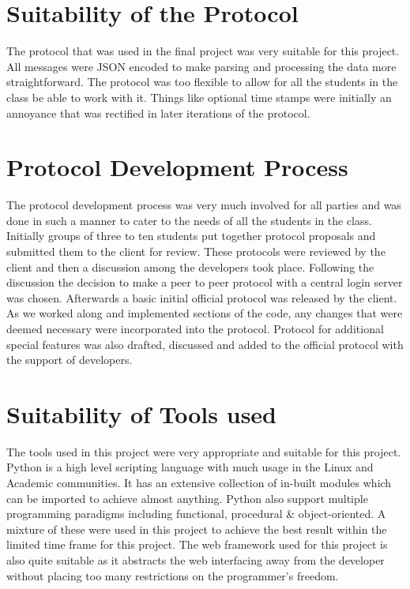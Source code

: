 \documentclass[a4paper,10pt,twoside]{article}
\begin{document}
\section{Suitability of the Protocol}

The protocol that was used in the final project was very suitable for this project. All messages were JSON encoded to make parsing and processing the data more straightforward. The protocol was too flexible to allow for all the students in the class be able to work with it. Things like optional time stamps were initially an annoyance that was rectified in later iterations of the protocol. 

\section{Protocol Development Process}

The protocol development process was very much involved for all parties and was done in such a manner to cater to the needs of all the students in the class. Initially groups of three to ten students put together protocol proposals and submitted them to the client for review. These protocols were reviewed by the client and then a discussion among the developers took place. Following the discussion the decision to make a peer to peer protocol with a central login server was chosen. Afterwards a basic initial official protocol was released by the client. As we worked along and implemented sections of the code, any changes that were deemed necessary were incorporated into the protocol. Protocol for additional special features was also drafted, discussed and added to the official protocol with the support of developers.

\section{Suitability of Tools used}

The tools used in this project were very appropriate and suitable for this project. Python is a high level scripting language with much usage in the Linux and Academic communities. It has an extensive collection of in-built modules which can be imported to achieve almost anything. Python also support multiple programming paradigms including functional, procedural \& object-oriented. A mixture of these were used in this project to achieve the best result within the limited time frame for this project. The web framework used for this project is also quite suitable as it abstracts the web interfacing away from the developer without placing too many restrictions on the programmer's freedom. 
\end{document}
